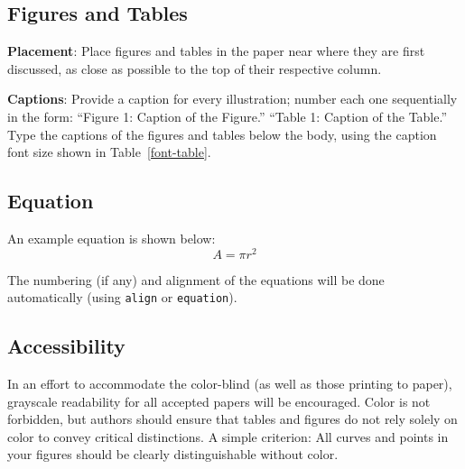 \documentclass[11pt,a4paper]{article}
\begin{document}
\subsection{Figures and Tables}


\textbf{Placement}: Place figures and tables in the paper near where they are first discussed, as close as possible to the top of their respective column.


\textbf{Captions}: Provide a caption for every illustration; number each one
sequentially in the form:  ``Figure 1: Caption of the Figure.'' ``Table 1:
Caption of the Table.''  Type the captions of the figures and 
tables below the body, using the caption font size shown in Table~\ref{font-table}.

\subsection{Equation}
\label{ssec:eqn}

An example equation is shown below:
\begin{equation}
A=\pi r^2
\end{equation}

The numbering (if any) and alignment of the equations will be done automatically (using \verb|align| or \verb|equation|).

\subsection{Accessibility}
\label{ssec:accessibility}

In an effort to accommodate the color-blind (as well as those printing
to paper), grayscale readability for all accepted papers will be
encouraged.  Color is not forbidden, but authors should ensure that
tables and figures do not rely solely on color to convey critical
distinctions.
A simple criterion: All curves and points in your figures should be clearly distinguishable without color.
\end{document}
